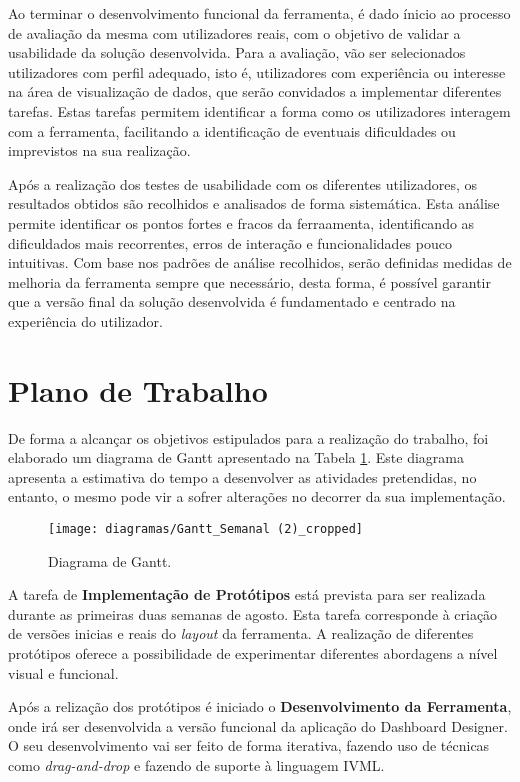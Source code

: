 Ao terminar o desenvolvimento funcional da ferramenta, é dado ínicio ao processo de avaliação da mesma com utilizadores reais, com o objetivo de validar a usabilidade da solução desenvolvida. Para a avaliação, vão ser selecionados utilizadores com perfil adequado, isto é, utilizadores com experiência ou interesse na área de visualização de dados, que serão convidados a implementar diferentes tarefas. Estas tarefas permitem identificar a forma como os utilizadores interagem com a ferramenta, facilitando a identificação de eventuais dificuldades ou imprevistos na sua realização.

Após a realização dos testes de usabilidade com os diferentes utilizadores, os resultados obtidos são recolhidos e analisados de forma sistemática. Esta análise permite identificar os pontos fortes e fracos da ferraamenta, identificando as dificuldados mais recorrentes, erros de interação e funcionalidades pouco intuitivas. Com base nos padrões de análise recolhidos, serão definidas medidas de melhoria da ferramenta sempre que necessário, desta forma, é possível garantir que a versão final da solução desenvolvida é fundamentado e centrado na experiência do utilizador.

\section{Plano de Trabalho} %
\label{sec:plano_trabalho}

De forma a alcançar os objetivos estipulados para a realização do trabalho, foi elaborado um diagrama de Gantt apresentado na Tabela \ref{tab:ganttchart}. Este diagrama apresenta a estimativa do tempo a desenvolver as atividades pretendidas, no entanto, o mesmo pode vir a sofrer alterações no decorrer da sua implementação.

\begin{figure}[htbp]
  \texttt{[image: diagramas/Gantt\_Semanal (2)\_cropped]}
  \centering
  \caption{Diagrama de Gantt.}
  \label{tab:ganttchart}
\end{figure}

A tarefa de \textbf{Implementação de Protótipos} está prevista para ser realizada durante as primeiras duas semanas de agosto. Esta tarefa corresponde à criação de versões inicias e reais do \textit{layout} da ferramenta. A realização de diferentes protótipos oferece a possibilidade de experimentar diferentes abordagens a nível visual e funcional.

Após a relização dos protótipos é iniciado o \textbf{Desenvolvimento da Ferramenta}, onde irá ser desenvolvida a versão funcional da aplicação do Dashboard Designer. O seu desenvolvimento vai ser feito de forma iterativa, fazendo uso de técnicas como \textit{drag-and-drop} e fazendo de suporte à linguagem \gls{IVML}.

